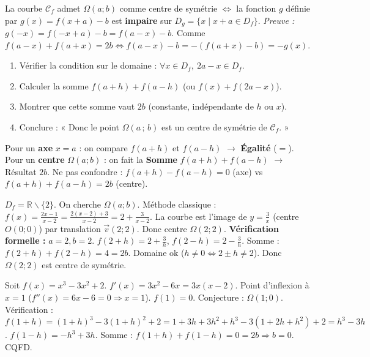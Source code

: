 \documentclass[11pt]{article}
\def\setminus{\mathbin{\backslash}}\let\smallsetminus\setminus
\begin{document}
\begin{propriete}
La courbe $\mathcal{C}_f$ admet $\Omega(a;b)$ comme centre de symétrie $\iff$ la fonction $g$ définie par $g(x)=f(x+a)-b$ est \textbf{impaire} sur $D_g = \{x \mid x+a \in D_f\}$.
\emph{Preuve :} $g(-x)=f(-x+a)-b=f(a-x)-b$. Comme $f(a-x)+f(a+x)=2b \iff f(a-x)-b = -(f(a+x)-b) = -g(x)$.
\end{propriete}

\begin{methode}
\begin{enumerate}
\item Vérifier la condition sur le domaine : $\forall x \in D_f,\ 2a-x \in D_f$.
\item Calculer la somme $f(a+h)+f(a-h)$ (ou $f(x)+f(2a-x)$).
\item Montrer que cette somme vaut $2b$ (constante, indépendante de $h$ ou $x$).
\item Conclure : « Donc le point $\Omega(a\,;\,b)$ est un centre de symétrie de $\mathcal{C}_f$. »
\end{enumerate}
\end{methode}

\begin{attention}
Pour un \textbf{axe} $x=a$ : on compare $f(a+h)$ et $f(a-h)$ $\rightarrow$ \textbf{Égalité} ($=$).
Pour un \textbf{centre} $\Omega(a;b)$ : on fait la \textbf{Somme} $f(a+h)+f(a-h)$ $\rightarrow$ Résultat $2b$.
Ne pas confondre : $f(a+h)-f(a-h)=0$ (axe) vs $f(a+h)+f(a-h)=2b$ (centre).
\end{attention}

\begin{exemplebox}[Centre de symétrie : $f(x)=\frac{2x-1}{x-2}$]
$D_f=\mathbb{R}\setminus\{2\}$. On cherche $\Omega(a;b)$.
Méthode classique : $f(x)=\frac{2x-1}{x-2}=\frac{2(x-2)+3}{x-2}=2+\frac{3}{x-2}$.
La courbe est l'image de $y=\frac{3}{x}$ (centre $O(0;0)$) par translation $\vec{v}(2;2)$.
Donc centre $\Omega(2;2)$.
\textbf{Vérification formelle :} $a=2, b=2$.
$f(2+h)=2+\frac{3}{h}$, $f(2-h)=2-\frac{3}{h}$.
Somme : $f(2+h)+f(2-h)=4=2b$. Domaine ok ($h\neq 0 \iff 2\pm h \neq 2$).
Donc $\Omega(2;2)$ est centre de symétrie.
\end{exemplebox}

\begin{exemplebox}
Soit $f(x)=x^3-3x^2+2$. $f'(x)=3x^2-6x=3x(x-2)$. Point d'inflexion à $x=1$ ($f''(x)=6x-6=0 \Rightarrow x=1$).
$f(1)=0$. Conjecture : $\Omega(1;0)$.
Vérification : $f(1+h)=(1+h)^3-3(1+h)^2+2 = 1+3h+3h^2+h^3 -3(1+2h+h^2)+2 = h^3 -3h$.
$f(1-h)= -h^3 +3h$.
Somme : $f(1+h)+f(1-h)=0=2b \Rightarrow b=0$. CQFD.
\end{exemplebox}
\end{document}
